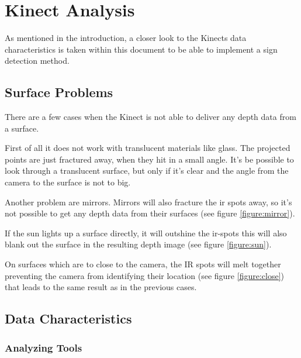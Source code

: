 \chapter{Kinect Analysis}
\graphicspath{{./KinectData/img/}}

As mentioned in the introduction, a closer look to the Kinects data characteristics is taken
within this document to be able to implement a sign detection method.

\section{Surface Problems}

There are a few cases when the Kinect is not able to deliver any depth data from a surface.

First of all it does not work with translucent materials like glass. The projected
points are just fractured away, when they hit in a small angle. It's be possible to look through 
a translucent surface, but only if it's clear and the angle from the camera to the surface is not
to big.

Another problem are mirrors. Mirrors will also fracture the ir spots away, 
so it's not possible to get any depth data from their surfaces (see figure \vref{figure:mirror}).

If the sun lights up a surface directly, it will outshine the ir-spots this will also blank out the surface
in the resulting depth image (see figure \vref{figure:sun}).

On surfaces which are to close to the camera, the IR spots will melt together preventing the camera from
identifying their location (see figure \vref{figure:close}) that leads to the same result as in the previous cases.

\section{Data Characteristics} 

\subsection{Analyzing Tools}

